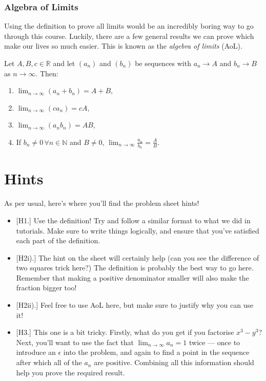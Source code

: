 \documentclass[
  12pt,
  a4paper]{extarticle}
\providecommand{\tightlist}{%
  \setlength{\itemsep}{0pt}\setlength{\parskip}{0pt}}
\theoremstyle{plain}
\theoremstyle{definition}
\theoremstyle{plain}
\theoremstyle{plain}
\theoremstyle{plain}
\theoremstyle{plain}
\theoremstyle{definition}
\theoremstyle{definition}
\theoremstyle{remark}
\theoremstyle{remark}
\let\BeginKnitrBlock\begin \let\EndKnitrBlock\end
\renewcommand{\;}{\,}
\begin{document}
\hypertarget{algebra-of-limits}{%
\subsubsection{Algebra of Limits}\label{algebra-of-limits}}

Using the definition to prove all limits would be an incredibly boring way to go through this course. Luckily, there are a few general results we can prove which make our lives so much easier. This is known as the \emph{algebra of limits} (AoL).

\BeginKnitrBlock{theorem}[Algebra of Limits]
{\label{thm:thm4} }Let \(A,B,c \in \mathbb{R}\) and let \((a_n)\) and \((b_n)\) be sequences with \(a_n \to A\) and \(b_n \to B\) as \(n \to \infty\). Then:

\begin{enumerate}
\def\labelenumi{\arabic{enumi}.}
\tightlist
\item
  \(\lim_{n \to \infty} (a_n + b_n) = A + B\),
\item
  \(\lim_{n \to \infty} (ca_n) = cA\),
\item
  \(\lim_{n \to \infty} (a_n b_n) = AB\),
\item
  If \(b_n \neq 0 \; \forall n \in \mathbb{N}\) and \(B \neq 0\), \(\lim_{n \to \infty} \frac{a_n}{b_n} = \frac{A}{B}\).
\end{enumerate}
\EndKnitrBlock{theorem}

\hypertarget{hints}{%
\section{Hints}\label{hints}}

As per usual, here's where you'll find the problem sheet hints!

\begin{itemize}
\tightlist
\item
  {[}H1.{]} Use the definition! Try and follow a similar format to what we did in tutorials. Make sure to write things logically, and ensure that you've satisfied each part of the definition.
\item
  {[}H2i).{]} The hint on the sheet will certainly help (can you see the difference of two squares trick here?) The definition is probably the best way to go here. Remember that making a positive denominator smaller will also make the fraction bigger too!
\item
  {[}H2ii).{]} Feel free to use AoL here, but make sure to justify why you can use it!
\item
  {[}H3.{]} This one is a bit tricky. Firstly, what do you get if you factorise \(x^3 - y^3\)? Next, you'll want to use the fact that \(\lim_{n \to \infty} a_n = 1\) twice --- once to introduce an \(\epsilon\) into the problem, and again to find a point in the sequence after which all of the \(a_n\) are positive. Combining all this information should help you prove the required result.
\end{itemize}
\end{document}
